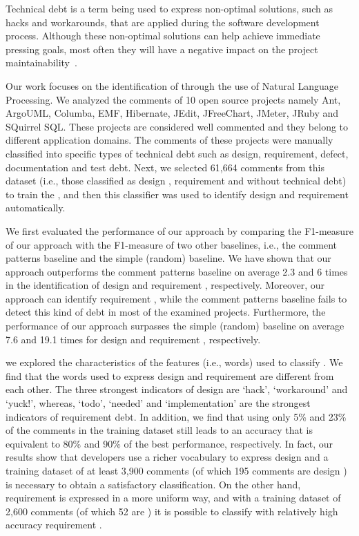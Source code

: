 Technical debt is a term being used to express non-optimal solutions, such as hacks and workarounds, that are applied during the software development process. Although these non-optimal solutions can help achieve immediate pressing goals, most often they will have a negative impact on the project maintainability~\cite{Zazworka2011MTD}. 

Our work focuses on the identification of \SATD through the use of Natural Language Processing. We analyzed the comments of 10 open source projects namely Ant, ArgoUML, Columba, EMF, Hibernate, JEdit, JFreeChart, JMeter, JRuby and SQuirrel SQL. These projects are considered well commented and they belong to different application domains. The comments of these projects were manually classified into specific types of technical debt such as design, requirement, defect, documentation and test debt. Next, we selected 61,664 comments from this dataset (i.e., those classified as design \SATD, requirement \SATD and without technical debt) to train the , and then this classifier was used to identify  design and requirement \SATD automatically.

We first evaluated the performance of our approach by comparing the F1-measure of our approach with the F1-measure of two other baselines, i.e., the comment patterns baseline and the simple (random) baseline. We have shown that our approach outperforms the comment patterns baseline on average 2.3 and 6 times in the identification of design and requirement \SATD, respectively. Moreover, our approach can identify requirement \SATD, while the comment patterns baseline fails to detect this kind of debt in most of the examined projects. Furthermore, the performance of our approach surpasses the simple (random) baseline on average 7.6 and 19.1 times for design and requirement \SATD, respectively. 

 we explored the characteristics of the features (i.e., words) used to classify \SATD. We find that the words used to express design and requirement \SATD are different from each other. The three strongest indicators of design \SATD are `hack', `workaround' and `yuck!', whereas, `todo', `needed' and `implementation' are the strongest indicators of requirement debt. In addition, we find that using only 5\% and 23\% of the comments in the training dataset still leads to an accuracy that is equivalent to 80\% and 90\% of the best performance, respectively. In fact, our results show that developers use a richer vocabulary to express design \SATD and a training dataset of at least 3,900 comments (of which 195 comments are design \SATD) is necessary to obtain a satisfactory classification. On the other hand, requirement \SATD is expressed in a more uniform way, and with a training dataset of 2,600 comments (of which 52 are \SATD) it is possible to classify with relatively high accuracy requirement \SATD.


